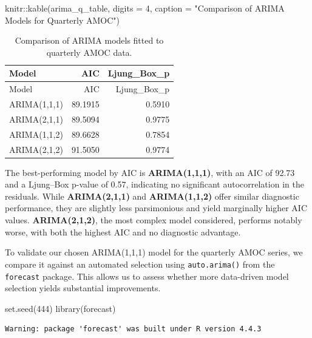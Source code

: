 \documentclass[
  11pt,
]{article}
\newenvironment{Shaded}{\begin{snugshade}}{\end{snugshade}}
\newcommand{\AttributeTok}[1]{\textcolor[rgb]{0.40,0.45,0.13}{#1}}
\newcommand{\DecValTok}[1]{\textcolor[rgb]{0.68,0.00,0.00}{#1}}
\newcommand{\FunctionTok}[1]{\textcolor[rgb]{0.28,0.35,0.67}{#1}}
\newcommand{\NormalTok}[1]{\textcolor[rgb]{0.00,0.23,0.31}{#1}}
\newcommand{\SpecialCharTok}[1]{\textcolor[rgb]{0.37,0.37,0.37}{#1}}
\newcommand{\StringTok}[1]{\textcolor[rgb]{0.13,0.47,0.30}{#1}}
\begin{document}
\begin{Shaded}
\begin{Highlighting}[]
\NormalTok{knitr}\SpecialCharTok{::}\FunctionTok{kable}\NormalTok{(arima\_q\_table, }\AttributeTok{digits =} \DecValTok{4}\NormalTok{, }\AttributeTok{caption =} \StringTok{"Comparison of ARIMA Models for Quarterly AMOC"}\NormalTok{)}
\end{Highlighting}
\end{Shaded}

\begin{longtable}[]{@{}lrr@{}}
\caption{Comparison of ARIMA models fitted to quarterly AMOC
data.}\tabularnewline
\toprule\noalign{}
Model & AIC & Ljung\_Box\_p \\
\midrule\noalign{}
\endfirsthead
\toprule\noalign{}
Model & AIC & Ljung\_Box\_p \\
\midrule\noalign{}
\endhead
\bottomrule\noalign{}
\endlastfoot
ARIMA(1,1,1) & 89.1915 & 0.5910 \\
ARIMA(2,1,1) & 89.5094 & 0.9775 \\
ARIMA(1,1,2) & 89.6628 & 0.7854 \\
ARIMA(2,1,2) & 91.5050 & 0.9774 \\
\end{longtable}

The best-performing model by AIC is \textbf{ARIMA(1,1,1)}, with an AIC
of 92.73 and a Ljung--Box p-value of 0.57, indicating no significant
autocorrelation in the residuals. While \textbf{ARIMA(2,1,1)} and
\textbf{ARIMA(1,1,2)} offer similar diagnostic performance, they are
slightly less parsimonious and yield marginally higher AIC values.
\textbf{ARIMA(2,1,2)}, the most complex model considered, performs
notably worse, with both the highest AIC and no diagnostic advantage.

To validate our chosen ARIMA(1,1,1) model for the quarterly AMOC series,
we compare it against an automated selection using \texttt{auto.arima()}
from the \texttt{forecast} package. This allows us to assess whether
more data-driven model selection yields substantial improvements.

\begin{Shaded}
\begin{Highlighting}[]
\FunctionTok{set.seed}\NormalTok{(}\DecValTok{444}\NormalTok{)}
\FunctionTok{library}\NormalTok{(forecast)}
\end{Highlighting}
\end{Shaded}

\begin{verbatim}
Warning: package 'forecast' was built under R version 4.4.3
\end{verbatim}
\end{document}
